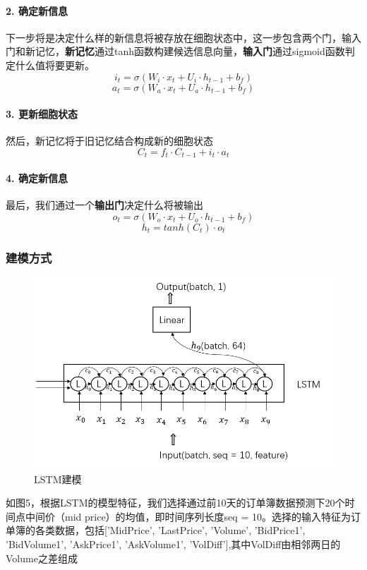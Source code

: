 \documentclass[UTF8]{ctexart}
\begin{document}
\paragraph*{2. 确定新信息}
下一步将是决定什么样的新信息将被存放在细胞状态中，这一步包含两个门，输入门和新记忆，\textbf{新记忆}通过tanh函数构建候选信息向量，\textbf{输入门}通过sigmoid函数判定什么值将要更新。
$$i_t = \sigma(W_i\cdot x_t + U_i\cdot h_{t-1} + b_f)$$
$$a_t = \sigma(W_a\cdot x_t + U_a\cdot h_{t-1} + b_f)$$
\paragraph*{3. 更新细胞状态}
然后，新记忆将于旧记忆结合构成新的细胞状态
$$C_t = f_t\cdot C_{t-1} + i_t \cdot a_t$$
\paragraph*{4. 确定新信息}
最后，我们通过一个\textbf{输出门}决定什么将被输出
$$o_t = \sigma(W_o\cdot x_t + U_o\cdot h_{t-1} + b_f)$$
$$h_t = tanh(C_t)\cdot o_t$$
\subsubsection{建模方式}
\begin{figure}[!htbp]
    \centering
    \includegraphics[scale = 0.6]{p6.png}
    \caption{LSTM建模\cite{2}}
\end{figure}
如图5，根据LSTM的模型特征，我们选择通过前10天的订单簿数据预测下20个时间点中间价（mid price）的均值，即时间序列长度seq = 10。选择的输入特征为订单簿的各类数据，包括['MidPrice', 'LastPrice', 'Volume', 'BidPrice1', 'BidVolume1', 'AskPrice1', 'AskVolume1', 'VolDiff'],其中VolDiff由相邻两日的Volume之差组成
\end{document}
